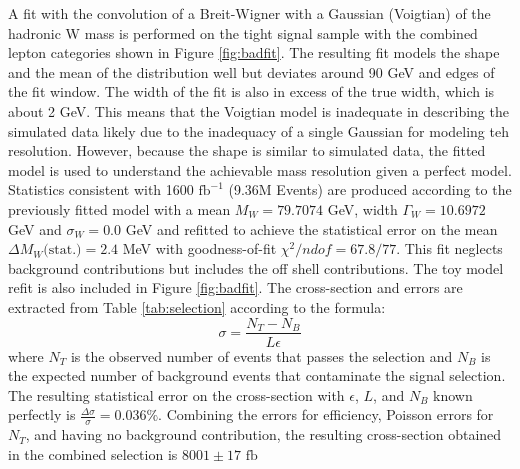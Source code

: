 A fit with the convolution of a Breit-Wigner with a Gaussian (Voigtian) of the hadronic W mass is performed on the tight signal sample with the combined lepton categories shown in Figure \ref{fig:badfit}. The resulting fit models the shape and the mean of the distribution well but deviates around 90 GeV and edges of the fit window. The width of the fit is also in excess of the true width, which is about 2 GeV. This means that the Voigtian model is inadequate in describing  the simulated data likely due to the inadequacy of a single Gaussian for modeling teh resolution. However, because the shape is similar to simulated data, the fitted model is used to understand the achievable mass resolution given a perfect model. Statistics consistent with 1600 $\text{fb}^{-1}$ (9.36M Events) are produced according to the previously fitted model with a mean  $M_W = 79.7074$ GeV, width $\Gamma_W = 10.6972$ GeV and $\sigma_W = 0.0$ GeV and refitted to achieve the statistical error on the mean $\Delta M_W \text{(stat.)} = 2.4$ MeV with goodness-of-fit $\chi^2 / ndof = 67.8/77$. This fit neglects background contributions but includes the off shell contributions. The toy model refit is also included in Figure \ref{fig:badfit}.
The cross-section and errors are extracted from Table \ref{tab:selection} according to the formula:
\begin{equation}
\sigma = \frac{N_T - N_B}{L \epsilon}
\end{equation}
where $N_T$ is the observed number of events that passes the selection and $N_B$ is the expected number of background events that contaminate the signal selection. The resulting statistical error on the cross-section with $\epsilon$, $L$, and $N_B$ known perfectly is $\frac{\Delta \sigma}{\sigma} = 0.036 \%$. Combining the errors for efficiency, Poisson errors for $N_T$, and having  no background contribution, the resulting cross-section obtained in the combined selection is $8001 \pm 17 \, \, \text{fb}$
